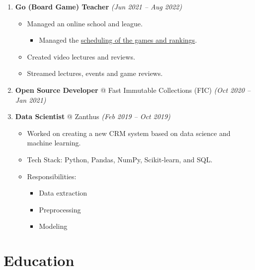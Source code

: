 \documentclass[14pt]{extarticle}
\renewcommand{\_}{\leavevmode\kern.06em\vbox{\hrule width.425em}}
\begin{document}
\begin{enumerate}
  \item \textbf{Go (Board Game) Teacher} \textit{(Jun 2021 -- Aug 2022)}
    \begin{itemize}
      \item Managed an online school and league.
        \begin{itemize}
          \item Managed the \href{https://docs.google.com/spreadsheets/d/1Nmf-qVtF1t-IQWB7Dul8G3B17y-wuyXiWfwxvFVyAbI/edit?gid=0#gid=0}{scheduling of the games and rankings}.
        \end{itemize}
      \item Created video lectures and reviews.
      \item Streamed lectures, events and game reviews.
    \end{itemize}
    
  \item \textbf{Open Source Developer} @ Fast Immutable Collections (FIC) \textit{(Oct 2020 -- Jan 2021)}
    
  \item \textbf{Data Scientist} @ Zanthus \textit{(Feb 2019 -- Oct 2019)}
    \begin{itemize}
      \item Worked on creating a new CRM system based on data science and machine learning.
      \item Tech Stack: Python, Pandas, NumPy, Scikit-learn, and SQL.
      \item Responsibilities:
      \begin{itemize}
        \item Data extraction
        \item Preprocessing
        \item Modeling
      \end{itemize}
    \end{itemize}
\end{enumerate}

\section{Education}
\end{document}
